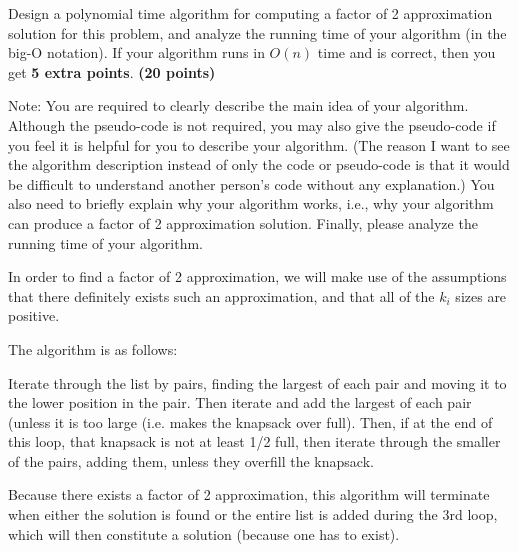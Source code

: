 \documentclass{article}
\begin{document}
Design a polynomial time algorithm for computing a factor of 2
approximation solution for this problem, and analyze the running time
of your algorithm (in the big-O notation). If your algorithm runs in
$O(n)$ time and is correct, then you get {\bf 5 extra points}. {\bf(20
  points)} 

Note: You are required to clearly describe the main idea of your
algorithm. Although the pseudo-code is not required, you may also give
the pseudo-code if you feel it is helpful for you to describe your
algorithm. (The reason I want to see the algorithm description instead
of only the code or pseudo-code is that it would be difficult to
understand another person's code without any explanation.) You also
need to briefly explain why your algorithm works, i.e., why your
algorithm can produce a factor of 2 approximation solution. Finally,
please analyze the running time of your algorithm. 



In order to find a factor of 2 approximation, we will make use of the
assumptions that there definitely exists such an approximation, and
that all of the $k_i$ sizes are positive.

The algorithm is as follows:

Iterate through the list by pairs, finding the largest of each pair
and moving it to the lower position in the pair.
Then iterate and add the largest of each pair (unless it is too large
(i.e. makes the knapsack over full).
Then, if at the end of this loop, that knapsack is not at least 1/2
full, then iterate through the smaller of the pairs, adding them,
unless they overfill the knapsack.

Because there exists a factor of 2 approximation, this algorithm will
terminate when either the solution is found or the entire list is
added during the 3rd loop, which will then constitute a solution
(because one has to exist).
\end{document}
